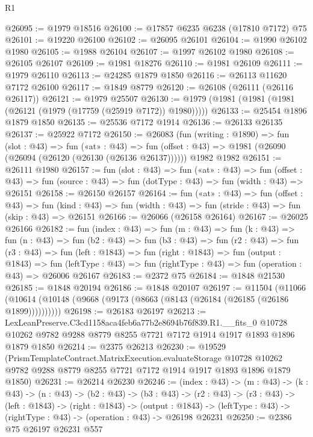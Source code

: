 \begin{lexlean}{R1}
\begin{coremodule}
@26095 := @1979 @18516
@26100 := @17857 @6235 @6238 (@17810 @7172) @75
@26101 := @19220 @26100
@26102 := @26095 @26101
@26104 := @1990 @26102 @1980
@26105 := @1988 @26104
@26107 := @1997 @26102 @1980
@26108 := @26105 @26107
@26109 := @1981 @18276
@26110 := @1981 @26109
@26111 := @1979 @26110
@26113 := @24285 @1879 @1850
@26116 := @26113 @11620 @7172 @26100
@26117 := @1849 @8779
@26120 := @26108 (@26111 (@26116 @26117))
@26121 := @1979 @25507
@26130 := @1979 (@1981 (@1981 (@1981 (@26121 (@1979 (@17759 (@25919 @7172)) @1980)))))
@26133 := @25454 @1896 @1879 @1850
@26135 := @25536 @7172 @1914
@26136 := @26133 @26135
@26137 := @25922 @7172
@26150 := @26083
    (fun (writing : @1890) =>
    fun (slot : @43) =>
    fun («at» : @43) =>
    fun (offset : @43) => @1981 (@26090 (@26094 (@26120 (@26130 (@26136 @26137))))))
    @1982
    @1982
@26151 := @26111 @1980
@26157 := fun (slot : @43) =>
  fun («at» : @43) =>
  fun (offset : @43) => fun (source : @43) => fun (dotType : @43) => fun (width : @43) => @26151
@26158 := @26150 @26157
@26164 := fun («at» : @43) =>
  fun (offset : @43) =>
  fun (kind : @43) => fun (width : @43) => fun (stride : @43) => fun (skip : @43) => @26151
@26166 := @26066 (@26158 @26164)
@26167 := @26025 @26166
@26182 := fun (index : @43) =>
  fun (m : @43) =>
  fun (k : @43) =>
  fun (n : @43) =>
  fun (b2 : @43) =>
  fun (b3 : @43) =>
  fun (r2 : @43) =>
  fun (r3 : @43) =>
  fun (left : @1843) =>
  fun (right : @1843) =>
  fun (output : @1843) =>
  fun (leftType : @43) => fun (rightType : @43) => fun (operation : @43) => @26006 @26167
@26183 := @2372 @75
@26184 := @1848 @21530
@26185 := @1848 @20194
@26186 := @1848 @20107
@26197 := @11504
    (@11066 (@10614 (@10148 (@9668 (@9173 (@8663 (@8143 (@26184 (@26185 (@26186 @1899))))))))))
@26198 := @26183 @26197
@26213 := LexLeanPreserve.C3cd1158aca4feb6a77b2e8694b76f839.R1.__fits_0
    @10728
    @10262
    @9782
    @9288
    @8779
    @8255
    @7721
    @7172
    @1914
    @1917
    @1893
    @1896
    @1879
    @1850
@26214 := @2375 @26213
@26230 := @19529
    (PrismTemplateContract.MatrixExecution.evaluateStorage
      @10728
      @10262
      @9782
      @9288
      @8779
      @8255
      @7721
      @7172
      @1914
      @1917
      @1893
      @1896
      @1879
      @1850)
@26231 := @26214 @26230
@26246 := (index : @43) ->
  (m : @43) ->
  (k : @43) ->
  (n : @43) ->
  (b2 : @43) ->
  (b3 : @43) ->
  (r2 : @43) ->
  (r3 : @43) ->
  (left : @1843) ->
  (right : @1843) ->
  (output : @1843) -> (leftType : @43) -> (rightType : @43) -> (operation : @43) -> @26198 @26231
@26250 := @2386 @75 @26197 @26231 @557

\end{coremodule}
\end{lexlean}
